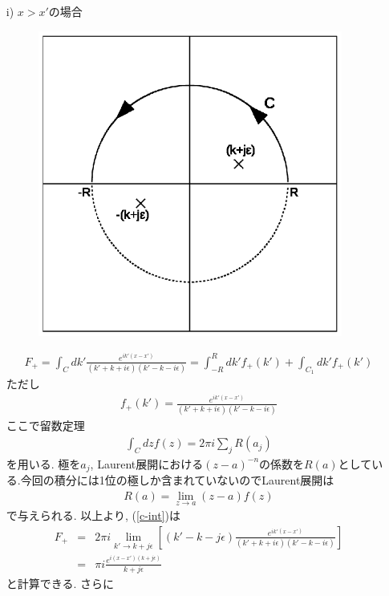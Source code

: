 \documentclass[10.5pt,a4paper]{jreport}
\begin{document}
\begin{itemize}
\item[i)] $x>x'$の場合
  \begin{figure}[htbp]
    \centering
    \includegraphics[width = 10cm]{./EPS/figure1new.eps}
    \label{fig1}
  \end{figure}
  \begin{eqnarray}
    F_+ = \int_{C} dk'\frac{e^{ik'(x-x')}}{(k'+k+i\epsilon)(k'-k-i\epsilon)} = \int_{-R}^Rdk' f_+(k') + \int_{C_1}dk'f_+(k')\label{c-int}
  \end{eqnarray}
  ただし
  \begin{eqnarray}
    f_+(k') = \frac{e^{ik'(x-x')}}{(k'+k+i\epsilon)(k'-k-i\epsilon)}
  \end{eqnarray}
  ここで留数定理
  \begin{eqnarray}
    \int_Cdz f(z) = 2\pi i\sum_j R(a_j)
  \end{eqnarray}
  を用いる. 極を$a_j$, Laurent展開における$(z-a)^{-n}$の係数を$R(a)$としている.今回の積分には1位の極しか含まれていないのでLaurent展開は
  \begin{eqnarray}
    R(a) = \lim_{z \rightarrow a}(z-a)f(z)
  \end{eqnarray}
  で与えられる. 以上より, (\ref{c-int})は
  \begin{eqnarray}
    F_+ &=& 2\pi i\lim_{k' \rightarrow k + j\epsilon }\left[(k'-k-j\epsilon)\frac{e^{ik'(x-x')}}{(k'+k+i\epsilon)(k'-k-i\epsilon)}\right]\\
    &=& \pi i\frac{e^{i(x-x')(k+j\epsilon)}}{k+j\epsilon}
  \end{eqnarray}
  と計算できる. さらに
  \begin{eqnarray}

\end{eqnarray}
\end{itemize}
\end{document}
